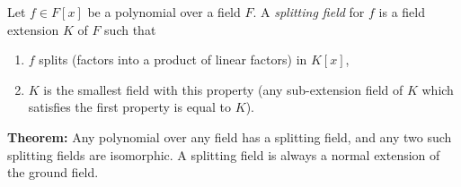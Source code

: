 \documentclass[12pt]{article}
\begin{document}
Let $f \in F[x]$ be a polynomial over a field $F$. A {\em splitting field} for $f$ is a field extension $K$ of $F$ such that
\begin{enumerate}
\item $f$ splits (factors into a product of linear factors) in $K[x]$,
\item $K$ is the smallest field with this property (any sub-extension field of $K$ which satisfies the first property is equal to $K$).
\end{enumerate}
{\bf Theorem:} Any polynomial over any field has a splitting field, and any two such splitting fields are isomorphic. A splitting field is always a normal extension of the ground field.
\end{document}
